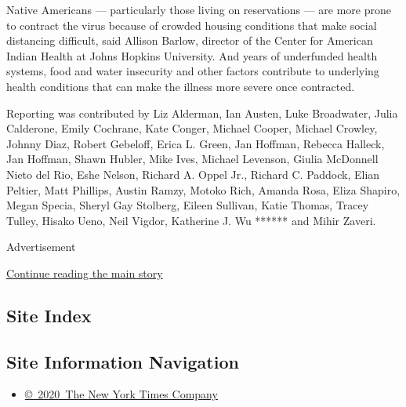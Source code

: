 Native Americans --- particularly those living on reservations --- are
more prone to contract the virus because of crowded housing conditions
that make social distancing difficult, said Allison Barlow, director of
the Center for American Indian Health at Johns Hopkins University. And
years of underfunded health systems, food and water insecurity and other
factors contribute to underlying health conditions that can make the
illness more severe once contracted.

Reporting was contributed by Liz Alderman, Ian Austen, Luke Broadwater,
Julia Calderone, Emily Cochrane, Kate Conger, Michael Cooper, Michael
Crowley, Johnny Diaz, Robert Gebeloff, Erica L. Green, Jan Hoffman,
Rebecca Halleck, Jan Hoffman, Shawn Hubler, Mike Ives, Michael Levenson,
Giulia McDonnell Nieto del Rio, Eshe Nelson, Richard A. Oppel Jr.,
Richard C. Paddock, Elian Peltier, Matt Phillips, Austin Ramzy, Motoko
Rich, Amanda Rosa, Eliza Shapiro, Megan Specia, Sheryl Gay Stolberg,
Eileen Sullivan, Katie Thomas, Tracey Tulley, Hisako Ueno, Neil Vigdor,
Katherine J. Wu ****** and Mihir Zaveri.

Advertisement

\protect\hyperlink{after-bottom}{Continue reading the main story}

\hypertarget{site-index}{%
\subsection{Site Index}\label{site-index}}

\hypertarget{site-information-navigation}{%
\subsection{Site Information
Navigation}\label{site-information-navigation}}

\begin{itemize}
\tightlist
\item
  \href{https://help.nytimes3xbfgragh.onion/hc/en-us/articles/115014792127-Copyright-notice}{©~2020~The
  New York Times Company}
\end{itemize}

